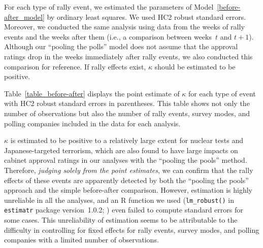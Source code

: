 \documentclass[12pt,letterpaper]{scrartcl}
\begin{document}
For each type of rally event, we estimated the parameters of Model~\eqref{before-after_model} by ordinary least squares. We used HC2 robust standard errors. Moreover, we conducted the same analysis using data from the weeks of rally events and the weeks after them (i.e., a comparison between weeks~$t$ and $t+1$). Although our ``pooling the polls'' model does not assume that the approval ratings drop in the weeks immediately after rally events, we also conducted this comparison for reference. If rally effects exist, $\kappa $ should be estimated to be positive.

Table~\ref{table_before-after} displays the point estimate of $\kappa $ for each type of event with HC2 robust standard errors in parentheses. This table shows not only the number of observations but also the number of rally events, survey modes, and polling companies included in the data for each analysis.

$\kappa $ is estimated to be positive to a relatively large extent for nuclear tests and Japanese-targeted terrorism, which are also found to have large impacts on cabinet approval ratings in our analyses with the ``pooling the pools'' method. Therefore, \emph{judging solely from the point estimates}, we can confirm that the rally effects of these events are apparently detected by both the ``pooling the pools'' approach and the simple before-after comparison. However, estimation is highly unreliable in all the analyses, and an R function we used (\texttt{lm\_robust()} in \texttt{estimatr} package version~1.0.2; \citealt{Blair2024}) even failed to compute standard errors for some cases. This unreliability of estimation seems to be attributable to the difficulty in controlling for fixed effects for rally events, survey modes, and polling companies with a limited number of observations.
\end{document}
